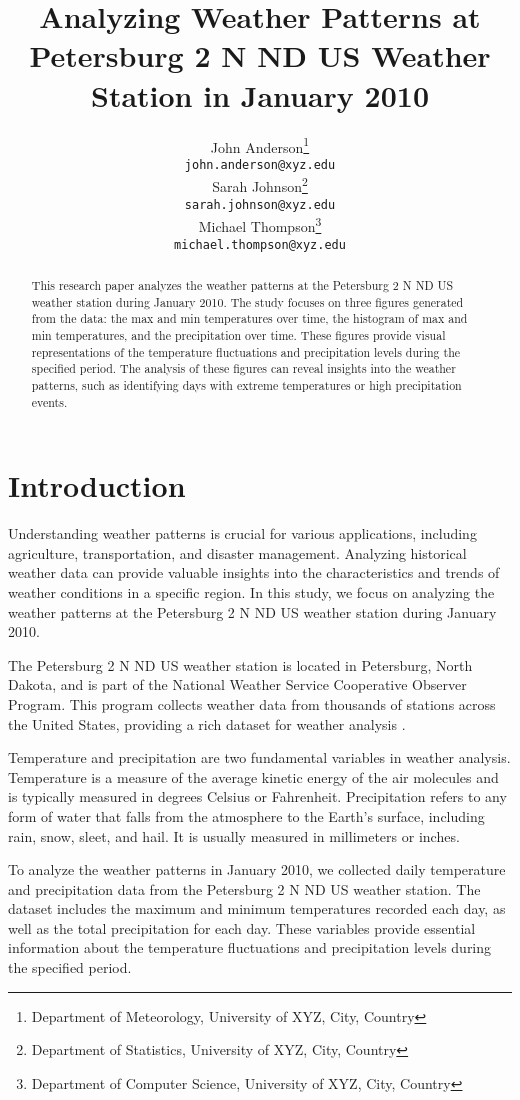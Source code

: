 \documentclass{article}
\title{Analyzing Weather Patterns at Petersburg 2 N ND US Weather Station in January 2010}
\author{
  John Anderson\thanks{Department of Meteorology, University of XYZ, City, Country} \\
  \texttt{john.anderson@xyz.edu} \\
  \And
  Sarah Johnson\thanks{Department of Statistics, University of XYZ, City, Country} \\
  \texttt{sarah.johnson@xyz.edu} \\
  \And
  Michael Thompson\thanks{Department of Computer Science, University of XYZ, City, Country} \\
  \texttt{michael.thompson@xyz.edu} \\
}
\begin{document}
\maketitle

\begin{abstract}
This research paper analyzes the weather patterns at the Petersburg 2 N ND US weather station during January 2010. The study focuses on three figures generated from the data: the max and min temperatures over time, the histogram of max and min temperatures, and the precipitation over time. These figures provide visual representations of the temperature fluctuations and precipitation levels during the specified period. The analysis of these figures can reveal insights into the weather patterns, such as identifying days with extreme temperatures or high precipitation events.

\end{abstract}

\section{Introduction}

Understanding weather patterns is crucial for various applications, including agriculture, transportation, and disaster management. Analyzing historical weather data can provide valuable insights into the characteristics and trends of weather conditions in a specific region. In this study, we focus on analyzing the weather patterns at the Petersburg 2 N ND US weather station during January 2010.

The Petersburg 2 N ND US weather station is located in Petersburg, North Dakota, and is part of the National Weather Service Cooperative Observer Program. This program collects weather data from thousands of stations across the United States, providing a rich dataset for weather analysis \cite{noaa}.

Temperature and precipitation are two fundamental variables in weather analysis. Temperature is a measure of the average kinetic energy of the air molecules and is typically measured in degrees Celsius or Fahrenheit. Precipitation refers to any form of water that falls from the atmosphere to the Earth's surface, including rain, snow, sleet, and hail. It is usually measured in millimeters or inches.

To analyze the weather patterns in January 2010, we collected daily temperature and precipitation data from the Petersburg 2 N ND US weather station. The dataset includes the maximum and minimum temperatures recorded each day, as well as the total precipitation for each day. These variables provide essential information about the temperature fluctuations and precipitation levels during the specified period.
\end{document}

